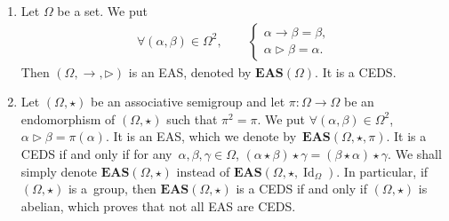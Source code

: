 \documentclass[pdftex]{sigma}
\numberwithin{equation}{section}
\newcommand{\eas}{\mathbf{EAS}}
\begin{document}
\begin{Example}\qquad
\begin{enumerate}\itemsep=0pt
\item[(1)] Let $\Omega$ be a set. We put
\begin{align*}
\forall (\alpha,\beta) \in \Omega^2,\qquad\begin{cases}
 \alpha \rightarrow \beta=\beta,\\
\alpha \triangleright \beta=\alpha.
\end{cases} \end{align*}
Then $(\Omega,\rightarrow,\triangleright)$ is an EAS, denoted by $\eas(\Omega)$. It is a CEDS.

\item[(2)] Let $(\Omega,\star)$ be an associative semigroup and let $\pi\colon\Omega\longrightarrow\Omega$ be an endomorphism of $(\Omega,\star)$ such that $\pi^2=\pi$. We put
$
\forall (\alpha,\beta) \in \Omega^2$, $ \alpha \triangleright \beta=\pi(\alpha)$.
It is an EAS, which we denote by~${\eas(\Omega,\star,\pi)}$. It is a CEDS if and only if for any~${\alpha,\beta,\gamma \in \Omega}$,
$(\alpha \star \beta)\star \gamma=(\beta \star \alpha)\star \gamma$.
We shall simply denote $\eas(\Omega,\star)$ instead of $\eas(\Omega,\star,\operatorname{Id}_\Omega)$. In particular, if $(\Omega,\star)$ is a~group, then $\eas(\Omega,\star)$ is a CEDS if and only if $(\Omega,\star)$ is abelian, which proves that not all EAS are CEDS.


\end{enumerate}
\end{Example}
\end{document}
